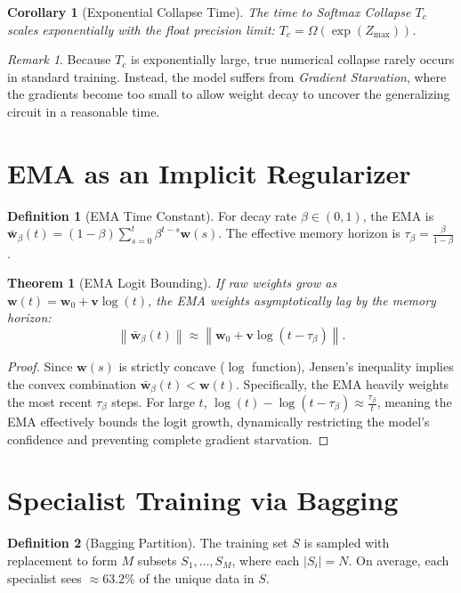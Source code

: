 \documentclass[11pt,a4paper]{article}
\theoremstyle{definition}
\newtheorem{definition}{Definition}[section]
\theoremstyle{plain}
\newtheorem{theorem}{Theorem}[section]
\newtheorem{corollary}{Corollary}[section]
\theoremstyle{remark}
\newtheorem{remark}{Remark}[section]
\newcommand{\w}{\mathbf{w}}
\newcommand{\vvec}{\mathbf{v}}
\newcommand{\norm}[1]{\left\|#1\right\|}
\begin{document}
\begin{corollary}[Exponential Collapse Time]
\label{cor:collapse-time}
The time to Softmax Collapse $T_c$ scales exponentially with the float precision limit: $T_c = \Omega(\exp(Z_{\max}))$.
\end{corollary}
\begin{remark}
Because $T_c$ is exponentially large, true numerical collapse rarely occurs in standard training. Instead, the model suffers from \textit{Gradient Starvation}, where the gradients become too small to allow weight decay to uncover the generalizing circuit in a reasonable time.
\end{remark}

\section{EMA as an Implicit Regularizer}
\label{sec:ema}

\begin{definition}[EMA Time Constant]
\label{def:time-constant}
For decay rate $\beta \in (0,1)$, the EMA is $\bar{\w}_\beta(t) = (1-\beta) \sum_{s=0}^t \beta^{t-s} \w(s)$. The effective memory horizon is $\tau_\beta = \frac{\beta}{1-\beta}$.
\end{definition}

\begin{theorem}[EMA Logit Bounding]
\label{thm:ema-bound}
If raw weights grow as $\w(t) = \w_0 + \vvec \log(t)$, the EMA weights asymptotically lag by the memory horizon:
\[
\norm{\bar{\w}_\beta(t)} \approx \norm{\w_0 + \vvec \log(t - \tau_\beta)}.
\]
\end{theorem}
\begin{proof}
Since $\w(s)$ is strictly concave ($\log$ function), Jensen's inequality implies the convex combination $\bar{\w}_\beta(t) < \w(t)$. Specifically, the EMA heavily weights the most recent $\tau_\beta$ steps. For large $t$, $\log(t) - \log(t - \tau_\beta) \approx \frac{\tau_\beta}{t}$, meaning the EMA effectively bounds the logit growth, dynamically restricting the model's confidence and preventing complete gradient starvation.
\end{proof}

\section{Specialist Training via Bagging}
\label{sec:specialists}

\begin{definition}[Bagging Partition]
\label{def:partition}
The training set $S$ is sampled with replacement to form $M$ subsets $S_1, \dots, S_M$, where each $|S_i| = N$. On average, each specialist sees $\approx 63.2\%$ of the unique data in $S$.
\end{definition}
\end{document}
